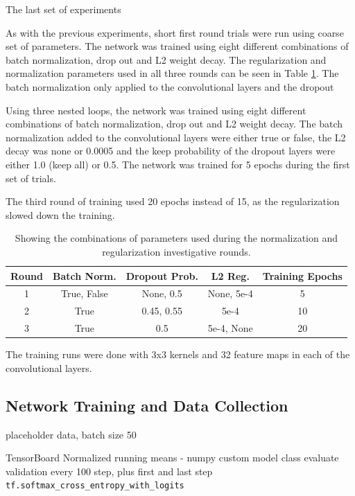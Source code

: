 \documentclass[]{article}
\begin{document}
The last set of experiments 

As with the previous experiments, short first round trials were run using coarse set of parameters. The network was trained using eight different combinations of batch normalization, drop out and L2 weight decay. The regularization and normalization parameters used in all three rounds can be seen in Table \ref{reg-table}. The batch normalization only applied to the convolutional layers and the dropout 

Using three nested loops, the network was trained using eight different combinations of batch normalization, drop out and L2 weight decay. The batch normalization added to the convolutional layers were either true or false, the L2 decay was none or 0.0005 and the keep probability of the dropout layers were either 1.0 (keep all) or 0.5. The network was trained for 5 epochs during the first set of trials. 

The third round of training used 20 epochs instead of 15, as the regularization slowed down the training.

\begin{table}[h]
	\centering
	\caption{Showing the combinations of parameters used during the normalization and regularization investigative rounds.}
	\label{reg-table}
	\begin{tabular}{@{}ccccc@{}}
		\toprule
		Round & Batch Norm. & Dropout Prob. & L2 Reg. & Training Epochs \\ \midrule
		1 & True, False & None, 0.5 & None, 5e-4 & 5 \\
		2 & True & 0.45, 0.55 & 5e-4 & 10 \\
		3 & True & 0.5 & 5e-4, None & 20 \\ \bottomrule
	\end{tabular}
\end{table}

The training runs were done with 3x3 kernels and 32 feature maps in each of the convolutional layers. 

\subsection{Network Training and Data Collection}

placeholder data, batch size 50

TensorBoard 
Normalized running means - numpy
custom model class
evaluate validation every 100 step, plus first and last step
\texttt{tf.softmax\_cross\_entropy\_with\_logits}
\end{document}
